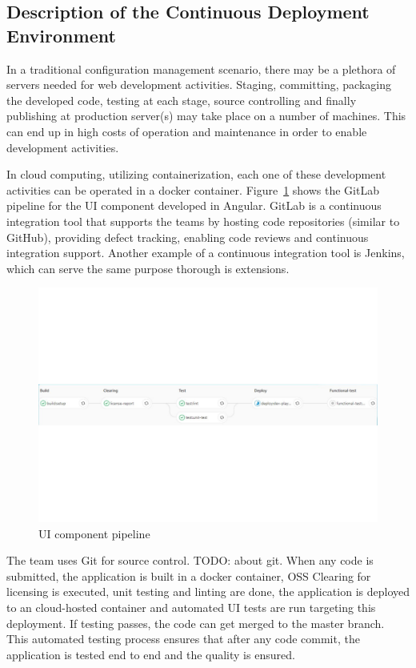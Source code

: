 \documentclass[conference]{IEEEtran}
\newcommand{\todo}[1]{}
\renewcommand{\todo}[1]{{\color{red} TODO: {#1}}}
\begin{document}
	\subsection{Description of the Continuous Deployment Environment }
	In a traditional configuration management scenario, there may be a plethora of servers needed for web development activities.
	Staging, committing, packaging the developed code, testing at each stage, source controlling and finally publishing at production server(s) may take place on a number of machines.
	This can end up in high costs of operation and maintenance in order to enable development activities.

	In cloud computing, utilizing containerization, each one of these development activities can be operated in a docker container.
	Figure~\ref{fig:UIpipeline} shows the GitLab pipeline for the UI component developed in Angular.
	GitLab is a continuous integration tool that supports the teams by hosting code repositories (similar to GitHub), providing defect tracking, enabling code reviews and continuous integration support. 
	Another example of a continuous integration tool is Jenkins, which can serve the same purpose thorough is extensions.

	\begin{figure}[!ht]
		\centering
			\includegraphics[width=1.00\textwidth]{UIpipeline.pdf}
		\caption{UI component pipeline}
		\label{fig:UIpipeline}
	\end{figure}
	

	The team uses Git for source control. \todo{about git}. 
	When any code is submitted, the application is built in a docker container, OSS Clearing for licensing is executed, unit testing and linting are done, the application is deployed to an cloud-hosted container and automated UI tests are run targeting this deployment.
	If testing passes, the code can get merged to the master branch. 
	This automated testing process ensures that after any code commit, the application is tested end to end and the quality is ensured. 
	
\end{document}
